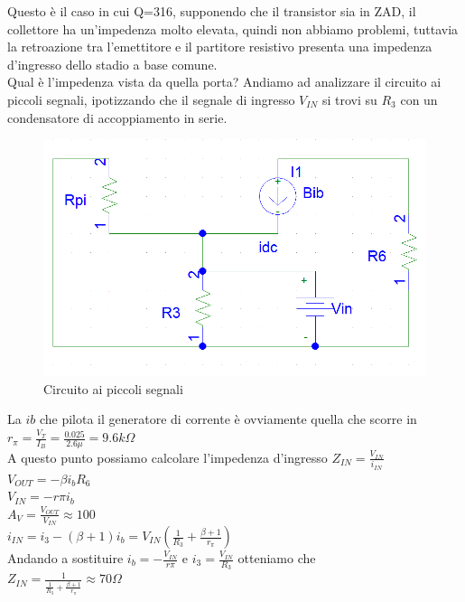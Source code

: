 \documentclass{article}
\begin{document}
Questo è il caso in cui Q=316, supponendo che il transistor sia in ZAD, il collettore ha un'impedenza molto elevata, quindi non abbiamo problemi, tuttavia la retroazione tra l'emettitore e il partitore resistivo presenta una impedenza d'ingresso dello stadio a base comune.\\
Qual è l'impedenza vista da quella porta? Andiamo ad analizzare il circuito ai piccoli segnali, ipotizzando che il segnale di ingresso $V_{IN}$ si trovi su $R_3$ con un condensatore di accoppiamento in serie.
~\begin{figure}[H]
\includegraphics[width=\textwidth]{PiccoliSegnali.png}
\centering
\caption{Circuito ai piccoli segnali}
\label{fig:foo}
\end{figure}
La $ib$ che pilota il generatore di corrente è ovviamente quella che scorre in $r_\pi=\frac{V_T}{I_B}=\frac{0.025}{2.6\mu }=9.6k\Omega$\\
A questo punto possiamo calcolare l'impedenza d'ingresso $Z_{IN}=\frac{V_{IN}}{i_{IN}}$\\
$V_{OUT}=- \beta i_b R_6$\\$V_{IN}=-r \pi i_b$\\
$A_V=\frac{V_{OUT}}{V_{IN}}\approx 100$\\
$i_{IN}=i_3-(\beta +1)i_b=V_{IN}(\frac{1}{R_3}+\frac{\beta +1}{r_\pi})$\\
Andando a sostituire $i_b=-\frac{V_{IN}}{r\pi}$ e $i_3=\frac{V_{IN}}{R_3}$ otteniamo che \\
$Z_{IN}=\frac{1}{\frac{1}{R_3}+\frac{\beta +1}{r_\pi}}\approx 70\Omega$
\end{document}
